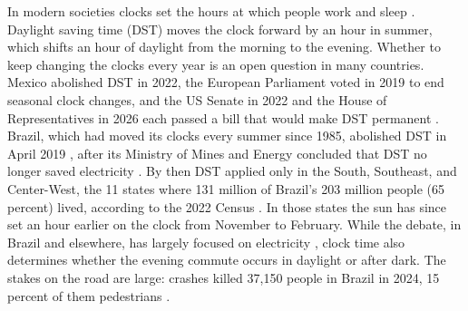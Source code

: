 
\introsection

In modern societies clocks set the hours at which people work and sleep \citep{hamermesh2008cues}. Daylight saving time (DST) moves the clock forward by an hour in summer, which shifts an hour of daylight from the morning to the evening. Whether to keep changing the clocks every year is an open question in many countries. Mexico abolished DST in 2022, the European Parliament voted in 2019 to end seasonal clock changes, and the US Senate in 2022 and the House of Representatives in 2026 each passed a bill that would make DST permanent \citep{mexico2022ley, europarl2019seasonal, uscongress2022sunshine, uscongress2026sunshine}. Brazil, which had moved its clocks every summer since 1985, abolished DST in April 2019 \citep{brasil2019decreto}, after its Ministry of Mines and Energy concluded that DST no longer saved electricity \citep{mme2019nota}. By then DST applied only in the South, Southeast, and Center-West, the 11 states where 131 million of Brazil's 203 million people (65 percent) lived, according to the 2022 Census \citep{ibge2023censo}. In those states the sun has since set an hour earlier on the clock from November to February. While the debate, in Brazil and elsewhere, has largely focused on electricity \citep{kellogg2008daylight, kotchen2011does}, clock time also determines whether the evening commute occurs in daylight or after dark. The stakes on the road are large: crashes killed 37,150 people in Brazil in 2024, 15 percent of them pedestrians \citep{datasus2025sim}. %

